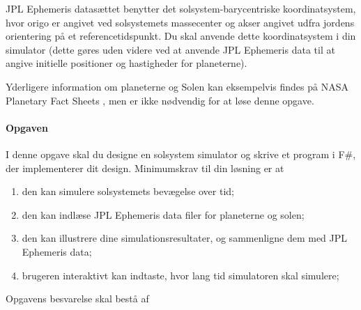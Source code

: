 \documentclass{article}
\begin{document}
\begin{enumerate}[label=11g.\arabic*,start=0]
JPL Ephemeris datasættet benytter det solsystem-barycentriske koordinatsystem, hvor origo er angivet ved solsystemets massecenter og akser angivet udfra jordens orientering på et referencetidspunkt. Du skal anvende dette koordinatsystem i din simulator (dette gøres uden videre ved at anvende JPL Ephemeris data til at angive initielle positioner og hastigheder for planeterne).

Yderligere information om planeterne og Solen kan eksempelvis findes på NASA Planetary Fact Sheets \cite{NASA}, men er ikke nødvendig for at løse denne opgave.

\paragraph{Opgaven}
I denne opgave skal du designe en solsystem simulator og skrive et program i F\#, der implementerer dit design. Minimumskrav til din løsning er at
\begin{enumerate}
\item den kan simulere solsystemets bevægelse over tid;
\item den kan indlæse JPL Ephemeris data filer for planeterne og solen;
\item den kan illustrere dine simulationsresultater, og sammenligne dem med JPL Ephemeris data;
\item brugeren interaktivt kan indtaste, hvor lang tid simulatoren skal simulere;
\end{enumerate}     

\noindent Opgavens besvarelse skal bestå af


\end{enumerate}
\end{document}
